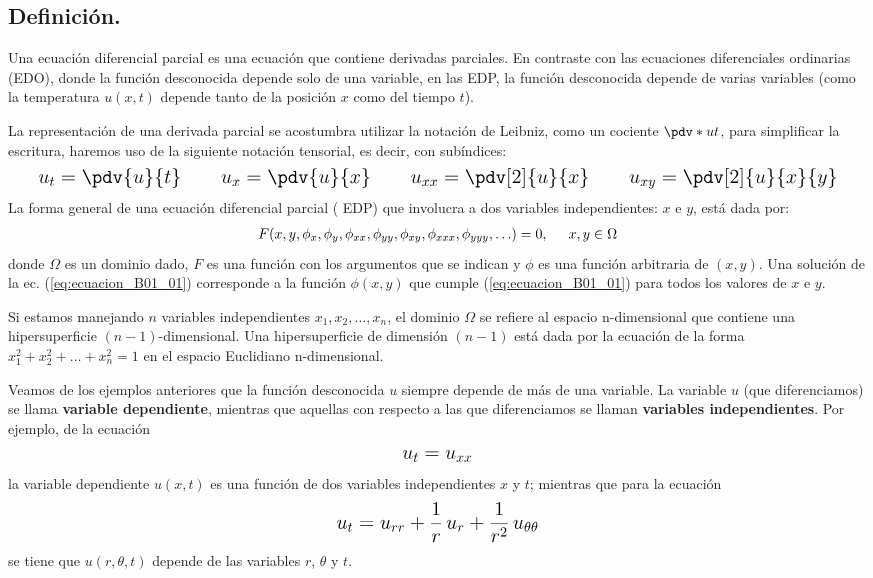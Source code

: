 \subsection*{Definición.}
Una ecuación diferencial parcial es una ecuación que contiene derivadas parciales. En contraste con las ecuaciones diferenciales ordinarias (EDO), donde la función desconocida depende solo de una variable, en las EDP, la función desconocida depende de varias variables (como la temperatura $u (x, t)$ depende tanto de la posición $x$ como del tiempo $t$).
\par
La representación de una derivada parcial se acostumbra utilizar la notación de Leibniz, como un cociente $\pdv*{u}{t}$, para simplificar la escritura, haremos uso de la siguiente notación tensorial, es decir, con subíndices:
\begin{align*}
\text{\Large{$
u_{t} = \pdv{u}{t} \hspace{1cm} u_{x} = \pdv{u}{x} \hspace{1cm} u_{xx} = \pdv[2]{u}{x} \hspace{1cm} u_{xy} = \pdv[2]{u}{x}{y}$}}
\end{align*}
La forma general de una ecuación diferencial parcial ( EDP) que involucra a dos variables independientes: $x$ e $y$, está dada por:
\begin{align}
F(x, y, \phi_{x}, \phi_{y}, \phi_{xx}, \phi_{yy}, \phi_{xy}, \phi_{xxx}, \phi_{yyy}, \ldots) = 0, \hspace{0.5cm} x, y \in \Omega
\label{eq:ecuacion_B01_01}
\end{align}
donde $\Omega$ es un dominio dado, $F$ es una función con los argumentos que se indican y $\phi$ es una función arbitraria de $(x, y)$. Una solución de la ec. (\ref{eq:ecuacion_B01_01}) corresponde a la función $\phi(x, y)$ que cumple (\ref{eq:ecuacion_B01_01}) para todos los valores de $x$ e $y$.
\par
Si estamos manejando $n$ variables independientes $x_{1}, x_{2}, \ldots, x_{n}$, el dominio $\Omega$ se refiere al espacio n-dimensional que contiene una hipersuperficie $(n-1)$-dimensional. Una hipersuperficie de dimensión $(n-1)$ está dada por la ecuación de la forma $x_{1}^{2} + x_{2}^{2} + \ldots + x_{n}^{2} = 1$ en el espacio Euclidiano n-dimensional.
\par
Veamos de los ejemplos anteriores que la función desconocida $u$ siempre depende de más de una variable. La variable $u$ (que diferenciamos) se llama \textbf{variable dependiente}, mientras que aquellas con respecto a las que diferenciamos se llaman \textbf{variables independientes}. Por ejemplo, de la ecuación
\begin{align*}
\text{\Large{$u_{t} = u_{xx}$}}
\end{align*}
la variable dependiente $u(x, t)$ es una función de dos variables independientes $x$ y $t$; mientras que para la ecuación
\begin{align*}
\text{\Large{$u_{t} = u_{rr} + \dfrac{1}{r} \, u_{r} + \dfrac{1}{r^{2}} \, u_{\theta \theta}$}}
\end{align*}
se tiene que $u(r, \theta, t)$ depende de las variables $r$, $\theta$ y $t$.

